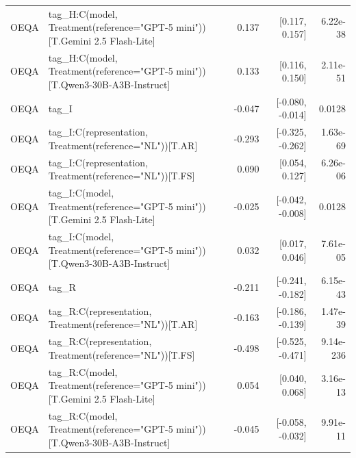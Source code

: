 \begin{tabular}{llrrr}
OEQA & tag\_H:C(model, Treatment(reference="GPT-5 mini"))[T.Gemini 2.5 Flash-Lite] & 0.137 & [0.117, 0.157] & 6.22e-38 \\
OEQA & tag\_H:C(model, Treatment(reference="GPT-5 mini"))[T.Qwen3-30B-A3B-Instruct] & 0.133 & [0.116, 0.150] & 2.11e-51 \\
OEQA & tag\_I & -0.047 & [-0.080, -0.014] & 0.0128 \\
OEQA & tag\_I:C(representation, Treatment(reference="NL"))[T.AR] & -0.293 & [-0.325, -0.262] & 1.63e-69 \\
OEQA & tag\_I:C(representation, Treatment(reference="NL"))[T.FS] & 0.090 & [0.054, 0.127] & 6.26e-06 \\
OEQA & tag\_I:C(model, Treatment(reference="GPT-5 mini"))[T.Gemini 2.5 Flash-Lite] & -0.025 & [-0.042, -0.008] & 0.0128 \\
OEQA & tag\_I:C(model, Treatment(reference="GPT-5 mini"))[T.Qwen3-30B-A3B-Instruct] & 0.032 & [0.017, 0.046] & 7.61e-05 \\
OEQA & tag\_R & -0.211 & [-0.241, -0.182] & 6.15e-43 \\
OEQA & tag\_R:C(representation, Treatment(reference="NL"))[T.AR] & -0.163 & [-0.186, -0.139] & 1.47e-39 \\
OEQA & tag\_R:C(representation, Treatment(reference="NL"))[T.FS] & -0.498 & [-0.525, -0.471] & 9.14e-236 \\
OEQA & tag\_R:C(model, Treatment(reference="GPT-5 mini"))[T.Gemini 2.5 Flash-Lite] & 0.054 & [0.040, 0.068] & 3.16e-13 \\
OEQA & tag\_R:C(model, Treatment(reference="GPT-5 mini"))[T.Qwen3-30B-A3B-Instruct] & -0.045 & [-0.058, -0.032] & 9.91e-11 \\
\bottomrule
\end{tabular}

